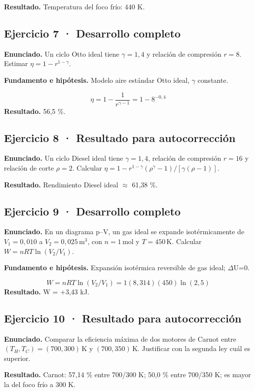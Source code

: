 \documentclass[11pt,a4paper]{article}
\begin{document}
\textbf{Resultado.} Temperatura del foco frío: 440 K.


\subsection*{Ejercicio 7 · Desarrollo completo}
\textbf{Enunciado.} Un ciclo Otto ideal tiene \(\gamma=1{,}4\) y relación de compresión \(r=8\). Estimar \(\eta=1-r^{1-\gamma}\).

\textbf{Fundamento e hipótesis.} Modelo aire estándar Otto ideal, \ensuremath{\gamma} constante.

\[
\eta=1-\frac1{r^{\gamma-1}}=1-8^{-0{,}4}
\]
\textbf{Resultado.} 56,5 \%.


\subsection*{Ejercicio 8 · Resultado para autocorrección}
\textbf{Enunciado.} Un ciclo Diesel ideal tiene \(\gamma=1{,}4\), relación de compresión \(r=16\) y relación de corte \(\rho=2\). Calcular \(\eta=1-r^{1-\gamma}(\rho^\gamma-1)/[\gamma(\rho-1)]\).

\textbf{Resultado.} Rendimiento Diesel ideal \ensuremath{\approx} 61,38 \%.


\subsection*{Ejercicio 9 · Desarrollo completo}
\textbf{Enunciado.} En un diagrama p--V, un gas ideal se expande isotérmicamente de \(V_1=0{,}010\) a \(V_2=0{,}025\,\mathrm{m^3}\), con \(n=1\,\mathrm{mol}\) y \(T=450\,\mathrm K\). Calcular \(W=nRT\ln(V_2/V_1)\).

\textbf{Fundamento e hipótesis.} Expansión isotérmica reversible de gas ideal; \ensuremath{\Delta}U=0.

\[
W=nRT\ln(V_2/V_1)=1(8{,}314)(450)\ln(2{,}5)
\]
\textbf{Resultado.} W = +3,43 kJ.


\subsection*{Ejercicio 10 · Resultado para autocorrección}
\textbf{Enunciado.} Comparar la eficiencia máxima de dos motores de Carnot entre \((T_H,T_C)=(700,300)\,\mathrm K\) y \((700,350)\,\mathrm K\). Justificar con la segunda ley cuál es superior.

\textbf{Resultado.} Carnot: 57,14 \% entre 700/300 K; 50,0 \% entre 700/350 K; es mayor la del foco frío a 300 K.
\end{document}
